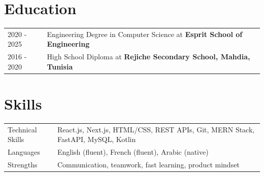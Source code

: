\documentclass[a4paper,11pt]{article}
\begin{document}
\section{Education}
\begin{tabularx}{\linewidth}{@{}l X@{}}
2020 - 2025 & Engineering Degree in Computer Science at \textbf{Esprit School of Engineering} \\

2016 - 2020 & High School Diploma at \textbf{Rejiche Secondary School, Mahdia, Tunisia} \\
\end{tabularx}

\section{Skills}
\begin{tabularx}{\linewidth}{@{}l X@{}}
Technical Skills & \normalsize{React.js, Next.js, HTML/CSS, REST APIs, Git, MERN Stack, FastAPI, MySQL, Kotlin}\\
Languages & \normalsize{English (fluent), French (fluent), Arabic (native)}\\
Strengths & \normalsize{Communication, teamwork, fast learning, product mindset}\\
\end{tabularx}
\end{document}

